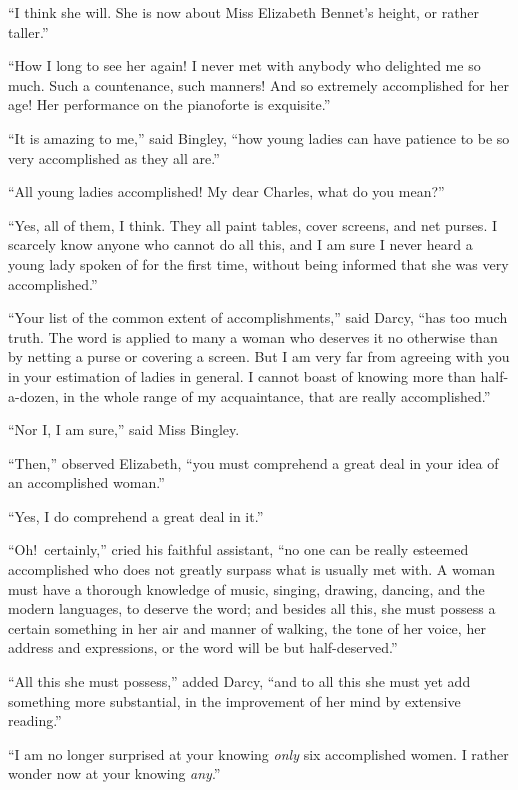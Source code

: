 \documentclass[12pt,english]{book}
\begin{document}
{}``I think she will. She is now about Miss Elizabeth Bennet's height,
or rather taller.''

{}``How I long to see her again! I never met with anybody who delighted
me so much. Such a countenance, such manners! And so extremely accomplished
for her age! Her performance on the pianoforte is exquisite.''

{}``It is amazing to me,'' said Bingley, {}``how young ladies can
have patience to be so very accomplished as they all are.''

{}``All young ladies accomplished! My dear Charles, what do you mean?''\ 

{}``Yes, all of them, I think. They all paint tables, cover screens,
and net purses. I scarcely know anyone who cannot do all this, and
I am sure I never heard a young lady spoken of for the first time,
without being informed that she was very accomplished.''

{}``Your list of the common extent of accomplishments,'' said Darcy,
{}``has too much truth. The word is applied to many a woman who deserves
it no otherwise than by netting a purse or covering a screen. But
I am very far from agreeing with you in your estimation of ladies
in general. I cannot boast of knowing more than half-a-dozen, in the
whole range of my acquaintance, that are really accomplished.''

{}``Nor I, I am sure,'' said Miss Bingley.

{}``Then,'' observed Elizabeth, {}``you must comprehend a great
deal in your idea of an accomplished woman.''

{}``Yes, I do comprehend a great deal in it.''

{}``Oh!\ certainly,'' cried his faithful assistant, {}``no one
can be really esteemed accomplished who does not greatly surpass what
is usually met with. A woman must have a thorough knowledge of music,
singing, drawing, dancing, and the modern languages, to deserve the
word; and besides all this, she must possess a certain something in
her air and manner of walking, the tone of her voice, her address
and expressions, or the word will be but half-deserved.''

{}``All this she must possess,'' added Darcy, {}``and to all this
she must yet add something more substantial, in the improvement of
her mind by extensive reading.''

{}``I am no longer surprised at your knowing \textit{only} six accomplished
women. I rather wonder now at your knowing \textit{any}.''
\end{document}
